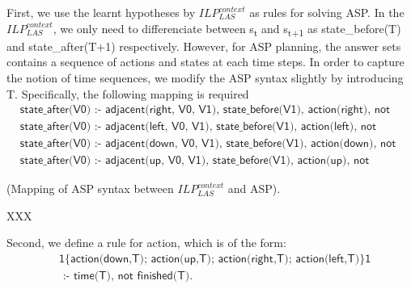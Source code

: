 First, we use the learnt hypotheses by $ILP_{LAS}^{context}$ as rules for solving ASP.
In the  $ILP_{LAS}^{context}$, we only need to differenciate between s\textsubscript{t} and s\textsubscript{t+1} as \textsf{state\_before(T)} and \textsf{state\_after(T+1)} respectively.
However, for ASP planning, the answer sets contains a sequence of actions and states at each time steps. In order to capture the notion of time sequences, we modify the ASP syntax slightly by 
introducing T. Specifically, the following mapping is required 
\begin{equation}
\begin{split}
&\textsf{state\_after(V0) :- adjacent(right, V0, V1), state\_before(V1), action(right), not wall(V0).}\\
&\textsf{state\_after(V0) :- adjacent(left, V0, V1), state\_before(V1), action(left), not wall(V0).}\\
&\textsf{state\_after(V0) :- adjacent(down, V0, V1), state\_before(V1), action(down), not wall(V0).}\\
&\textsf{state\_after(V0) :- adjacent(up, V0, V1), state\_before(V1), action(up), not wall(V0).}
\end{split}
\end{equation}

\begin{examp} \normalfont (Mapping of ASP syntax between $ILP_{LAS}^{context}$ and ASP).

XXX
\end{examp}

Second, we define a rule for action, which is of the form:
\begin{equation}\label{eq:choice_rule}
\begin{split}
&\textsf{1\{action(down,T); action(up,T); action(right,T); action(left,T)\}1} \\
&\textsf{ :- time(T), not finished(T).}\\
\end{split}
\end{equation}

